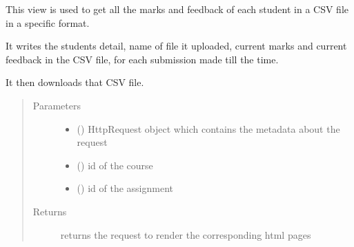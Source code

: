 \documentclass[letterpaper,10pt,english]{sphinxmanual}
\begin{document}
\begin{fulllineitems}
\label{\detokenize{users:users.views.export_to_csv}}
\sphinxAtStartPar
This view is used to get all the marks and feedback of each student in a CSV file in a specific format.

\sphinxAtStartPar
It writes the students detail, name of file it uploaded, current marks and current feedback in the CSV file, for each submission made till the time.

\sphinxAtStartPar
It then downloads that CSV file.
\begin{quote}\begin{description}
\item[{Parameters}] \leavevmode\begin{itemize}
\item {} 
\sphinxAtStartPar
{} () \textendash{} HttpRequest object which contains the metadata about the request

\item {} 
\sphinxAtStartPar
{} () \textendash{} id of the course

\item {} 
\sphinxAtStartPar
{} () \textendash{} id of the assignment

\end{itemize}

\item[{Returns}] \leavevmode
\sphinxAtStartPar
returns the request to render the corresponding html pages

\end{description}\end{quote}

\end{fulllineitems}

\end{document}

